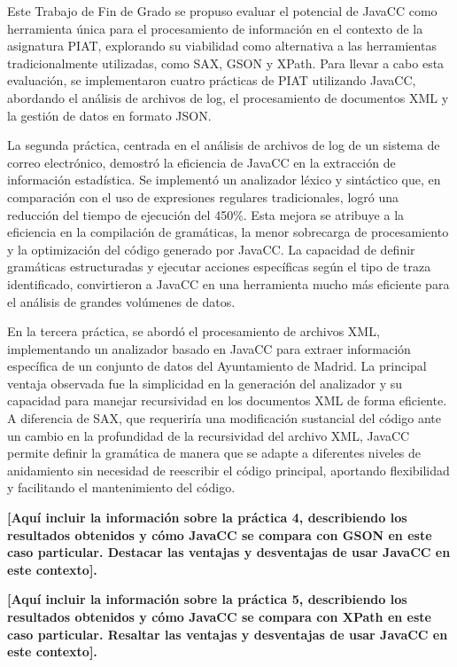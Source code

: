 \noindent Este Trabajo de Fin de Grado se propuso evaluar el potencial de JavaCC como herramienta única para el procesamiento de información en el contexto de la asignatura PIAT, explorando su viabilidad como alternativa a las herramientas tradicionalmente utilizadas, como SAX, GSON y XPath. Para llevar a cabo esta evaluación, se implementaron cuatro prácticas de PIAT utilizando JavaCC, abordando el análisis de archivos de log, el procesamiento de documentos XML y la gestión de datos en formato JSON.

La segunda práctica, centrada en el análisis de archivos de log de un sistema de correo electrónico, demostró la eficiencia de JavaCC en la extracción de información estadística. Se implementó un analizador léxico y sintáctico que, en comparación con el uso de expresiones regulares tradicionales, logró una reducción del tiempo de ejecución del 450\%. Esta mejora se atribuye a la eficiencia en la compilación de gramáticas, la menor sobrecarga de procesamiento y la optimización del código generado por JavaCC. La capacidad de definir gramáticas estructuradas y ejecutar acciones específicas según el tipo de traza identificado, convirtieron a JavaCC en una herramienta mucho más eficiente para el análisis de grandes volúmenes de datos.

En la tercera práctica, se abordó el procesamiento de archivos XML, implementando un analizador basado en JavaCC para extraer información específica de un conjunto de datos del Ayuntamiento de Madrid. La principal ventaja observada fue la simplicidad en la generación del analizador y su capacidad para manejar recursividad en los documentos XML de forma eficiente. A diferencia de SAX, que requeriría una modificación sustancial del código ante un cambio en la profundidad de la recursividad del archivo XML, JavaCC permite definir la gramática de manera que se adapte a diferentes niveles de anidamiento sin necesidad de reescribir el código principal, aportando flexibilidad y facilitando el mantenimiento del código.

\textbf{[Aquí incluir la información sobre la práctica 4, describiendo los resultados obtenidos y cómo JavaCC se compara con GSON en este caso particular. Destacar las ventajas y desventajas de usar JavaCC en este contexto].}

\textbf{[Aquí incluir la información sobre la práctica 5, describiendo los resultados obtenidos y cómo JavaCC se compara con XPath en este caso particular. Resaltar las ventajas y desventajas de usar JavaCC en este contexto].}

